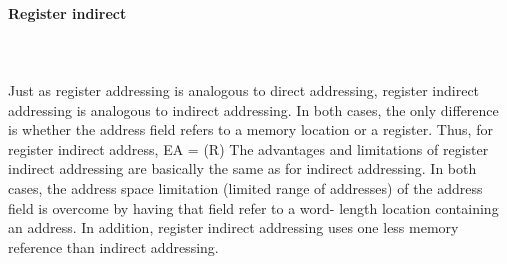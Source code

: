 \paragraph{Register indirect}\mbox{}\\\\%
Just as register addressing is analogous to direct addressing, register indirect addressing
is analogous to indirect addressing. In both cases, the only difference is whether
the address field refers to a memory location or a register. Thus, for register indirect
address,
EA = (R)
The advantages and limitations of register indirect addressing are basically the same
as for indirect addressing. In both cases, the address space limitation (limited range
of addresses) of the address field is overcome by having that field refer to a word-
length
location containing an address. In addition, register indirect addressing uses
one less memory reference than indirect addressing.
